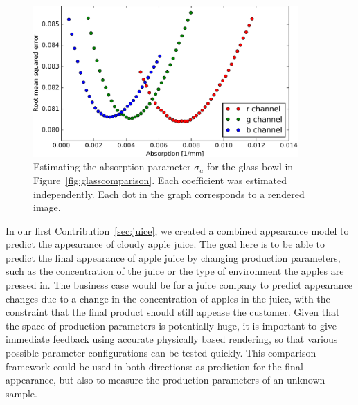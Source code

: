 \begin{figure}
\centering
\includegraphics[width=0.9\textwidth]{figures/glass_bowl_analysis_by_synthesis}  \caption{Estimating the absorption parameter $\sigma_a$ for the glass bowl in Figure~\ref{fig:glasscomparison}. Each coefficient was estimated independently. Each dot in the graph corresponds to a rendered image. }
\label{fig:glasscomparisongraph}
\end{figure}

In our first Contribution~\ref{sec:juice}, we created a combined appearance model to predict the appearance of cloudy apple juice. The goal here is to be able to predict the final appearance of apple juice by changing production parameters, such as the concentration of the juice or the type of environment the apples are pressed in. The business case would be for a juice company to predict appearance changes due to a change in the concentration of apples in the juice, with the constraint that the final product should still appease  the customer. Given that the space of production parameters is potentially huge, it is important to give immediate feedback using accurate physically based rendering, so that various possible parameter configurations can be tested quickly. This comparison framework could be used in both directions: as prediction for the final appearance, but also to measure the production parameters of an unknown sample. 

